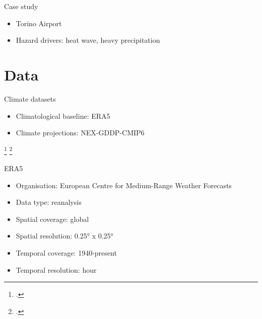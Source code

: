 \documentclass[aspectratio=169]{beamer}
\begin{document}
\begin{frame}{Case study}
  \begin{itemize}
    \item<1-> Torino Airport
    \item<2-> Hazard drivers: heat wave, heavy precipitation
  \end{itemize}
\end{frame}



\section{Data}
\begin{frame}{Climate datasets}
  \begin{itemize}
    \item Climatological baseline: ERA5\footnotemark
    \item Climate projections: NEX-GDDP-CMIP6\footnotemark
  \end{itemize}
  \footcitetext{2023HersbachERA5Hourly}
  \footcitetext{2021ThrasherNEX-GDDP-CMIP6,2022ThrasherNASAGlobal}
\end{frame}

\begin{frame}{ERA5}
  \begin{itemize}
    \item Organisation: European Centre for Medium-Range Weather Forecasts
    \item Data type: reanalysis
    \item Spatial coverage: global
    \item Spatial resolution: 0.25° x 0.25°
    \item Temporal coverage: 1940-present
    \item Temporal resolution: hour
  \end{itemize}
\end{frame}
\end{document}
